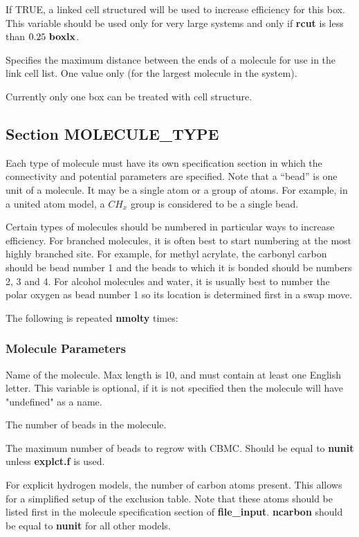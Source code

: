 \documentclass[12pt,letterpaper]{article}
\begin{document}
 If TRUE, a linked cell
structured will be used to increase efficiency for this box.
This variable should be used only for very large systems and
only if {\bf rcut} is less than $0.25~{\bf boxlx}$.

 Specifies the maximum distance
between the ends of a molecule for use in the link cell
list. One value only (for the largest molecule in the
system).

Currently only one box can be treated with cell structure.

\subsection{Section \textbf{MOLECULE\_TYPE}}
Each type of molecule must have its own specification
section in which the connectivity and potential parameters
are specified. Note that a ``bead'' is one unit of a
molecule. It may be a single atom or a group of atoms. For
example, in a united atom model, a $CH_x$ group is
considered to be a single bead.

Certain types of molecules should be numbered in particular
ways to increase efficiency. For branched molecules, it is
often best to start numbering at the most highly branched
site. For example, for methyl acrylate, the carbonyl carbon
should be bead number 1 and the beads to which it is bonded
should be numbers 2, 3 and 4. For alcohol molecules and
water, it is usually best to number the polar oxygen as bead
number 1 so its location is determined first in a swap move.

The following is repeated {\bf nmolty} times:

\subsubsection{Molecule Parameters}

 Name of the molecule. Max length
is 10, and must contain at least one English letter. This
variable is optional, if it is not specified then the molecule
will have "undefined" as a name.

 The number of beads in the molecule.

 The maximum number of beads to regrow
with CBMC. Should be equal to {\bf nunit} unless {\bf
  explct.f} is used.

 For explicit hydrogen models, the
number of carbon atoms present. This allows for a simplified
setup of the exclusion table. Note that these atoms should
be listed first in the molecule specification section of
{\bf file\_input}. {\bf ncarbon} should be equal to {\bf
  nunit} for all other models.
\end{document}
